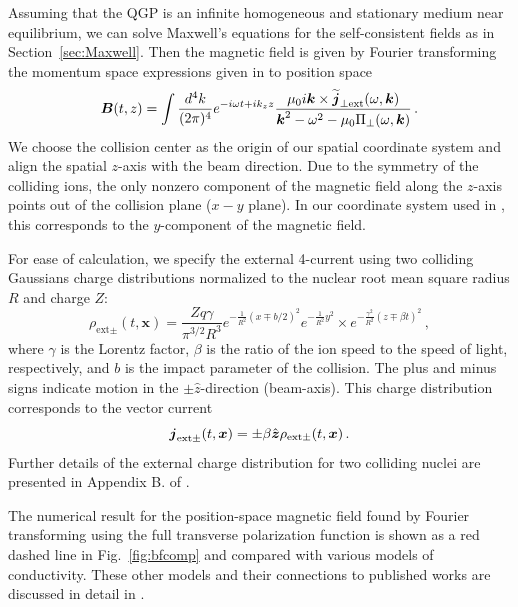 \label{sec:Maxwell2}
Assuming that the QGP is an infinite homogeneous and stationary medium near equilibrium, we can solve Maxwell's equations for the self-consistent fields as in Section~\ref{sec:Maxwell}. Then the magnetic field is given by Fourier transforming the momentum space expressions given in  to position space
\begin{equation}\label{eq:magorgin}
   \boldsymbol{B}(t, z) = \int \frac{d^4k}{(2\pi)^4}  e^{-i\omega t+ik_z z}
 \frac{\mu_0 i \boldsymbol{k} \times\widetilde{\boldsymbol{j}}_{\perp \text{ext}}(\omega, \boldsymbol{k})}{\boldsymbol{k}^2 - \omega^2 - \mu_0 \Pi_{\perp}(\omega, \boldsymbol{k})}\,.
\end{equation}
We choose the collision center as the origin of our spatial coordinate system and align the spatial $z$-axis with the beam direction. Due to the symmetry of the colliding ions, the only nonzero component of the magnetic field along the $z$-axis points out of the collision plane ($x-y$ plane). In our coordinate system used in \cite{Grayson:2022asf}, this corresponds to the $y$-component of the magnetic field. 

For ease of calculation, we specify the external 4-current using two colliding Gaussians charge distributions normalized to the nuclear root mean square radius $R$ and charge $Z$:
\begin{equation}\label{eq:rhoext}
\rho_{\text{ext}\pm }(t,\boldsymbol{x}) = \frac{Zq\gamma}{\pi^{3/2}R^3}e^{-\frac{1}{R^2}(x\mp b/2)^2}e^{-\frac{1}{R^2}y^2}
\times e^{-\frac{\gamma^2}{R^2}(z\mp \beta t)^2}\,,
\end{equation}
where $\gamma$ is the Lorentz factor, $\beta$ is the ratio of the ion speed to the speed of light, respectively, and $b$ is the impact parameter of the collision. The plus and minus signs indicate motion in the $\pm \hat{z}$-direction (beam-axis). This charge distribution corresponds to the vector current
\begin{equation}\label{eq:jext}
\boldsymbol{j}_{\text{ext}\pm}(t, \boldsymbol{x}) = \pm \beta \hat{\boldsymbol{z}} \rho_{\text{ext}\pm}(t, \boldsymbol{x})\,.
\end{equation}
Further details of the external charge distribution for two colliding nuclei are presented in Appendix B. of \cite{Grayson:2022asf}.

The numerical result for the position-space magnetic field found by Fourier transforming  using the full transverse polarization function  is shown as a red dashed line in Fig.~\ref{fig:bfcomp} and compared with various models of conductivity. These other models and their connections to published works are discussed in detail in \cite{Grayson:2022asf}.

